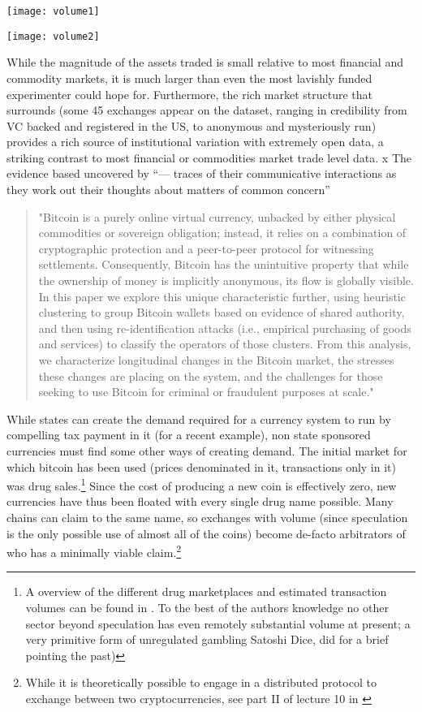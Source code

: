 \texttt{[image: volume1]}

\texttt{[image: volume2]}

While the magnitude of the assets traded is small relative to most financial and commodity markets, it is much larger than even the most lavishly funded experimenter could hope for.
Furthermore, the rich market structure that surrounds (some 45 exchanges appear on the dataset, ranging in credibility from VC backed and registered in the US, to anonymous and mysteriously run) provides a rich source of institutional variation with extremely open data, a striking contrast to most financial or commodities market trade level data. 
x
The evidence based uncovered by “— traces of their communicative interactions as they work out their thoughts about matters of common concern” 

\begin{quote}
"Bitcoin is a purely online virtual currency, unbacked by either physical commodities or sovereign obligation; instead, it relies on a combination of cryptographic protection and a peer-to-peer protocol for witnessing settlements. Consequently, Bitcoin has the unintuitive property that while the ownership of money is implicitly anonymous, its flow is globally visible. In this paper we explore this unique characteristic further, using heuristic clustering to group Bitcoin wallets based on evidence of shared authority, and then using re-identification attacks (i.e., empirical purchasing of goods and services) to classify the operators of those clusters. From this analysis, we characterize longitudinal changes in the Bitcoin market, the stresses these changes are placing on the system, and the challenges for those seeking to use Bitcoin for criminal or fraudulent purposes at scale." 
\end{quote} 
\cite{meiklejohn2013fistful}

While states can create the demand required for a currency system to run by compelling tax payment in it (for a recent example), non state sponsored currencies must find some other ways of creating demand.
The initial market for which bitcoin has been used (prices denominated in it, transactions only in it) was drug sales.\footnote{A overview of the different drug marketplaces and estimated transaction volumes can be found in \cite{soska2015measuring}. To the best of the authors knowledge no other sector beyond speculation has even remotely substantial volume at present; a very primitive form of unregulated gambling Satoshi Dice, did for a brief pointing the past)   }
Since the cost of producing a new coin is effectively zero, new currencies have thus been floated with every single drug name possible. Many chains can claim to the same name, so exchanges with volume (since speculation is the only possible use of almost all of the coins) become de-facto arbitrators of who has a minimally viable claim.\footnote{While it is theoretically possible to engage in a distributed protocol to exchange between two cryptocurrencies, see part II of lecture 10 in \cite{princeton10}}





